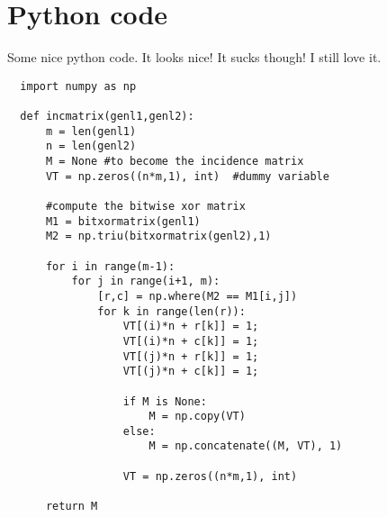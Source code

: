 \documentclass{article}
\begin{document}
\section{Python code}
Some nice python code. It looks nice! It sucks though! I still love it.

\begin{verbatim}
  import numpy as np
   
  def incmatrix(genl1,genl2):
      m = len(genl1)
      n = len(genl2)
      M = None #to become the incidence matrix
      VT = np.zeros((n*m,1), int)  #dummy variable
   
      #compute the bitwise xor matrix
      M1 = bitxormatrix(genl1)
      M2 = np.triu(bitxormatrix(genl2),1) 
   
      for i in range(m-1):
          for j in range(i+1, m):
              [r,c] = np.where(M2 == M1[i,j])
              for k in range(len(r)):
                  VT[(i)*n + r[k]] = 1;
                  VT[(i)*n + c[k]] = 1;
                  VT[(j)*n + r[k]] = 1;
                  VT[(j)*n + c[k]] = 1;
   
                  if M is None:
                      M = np.copy(VT)
                  else:
                      M = np.concatenate((M, VT), 1)
   
                  VT = np.zeros((n*m,1), int)
   
      return M
\end{verbatim}
\end{document}
